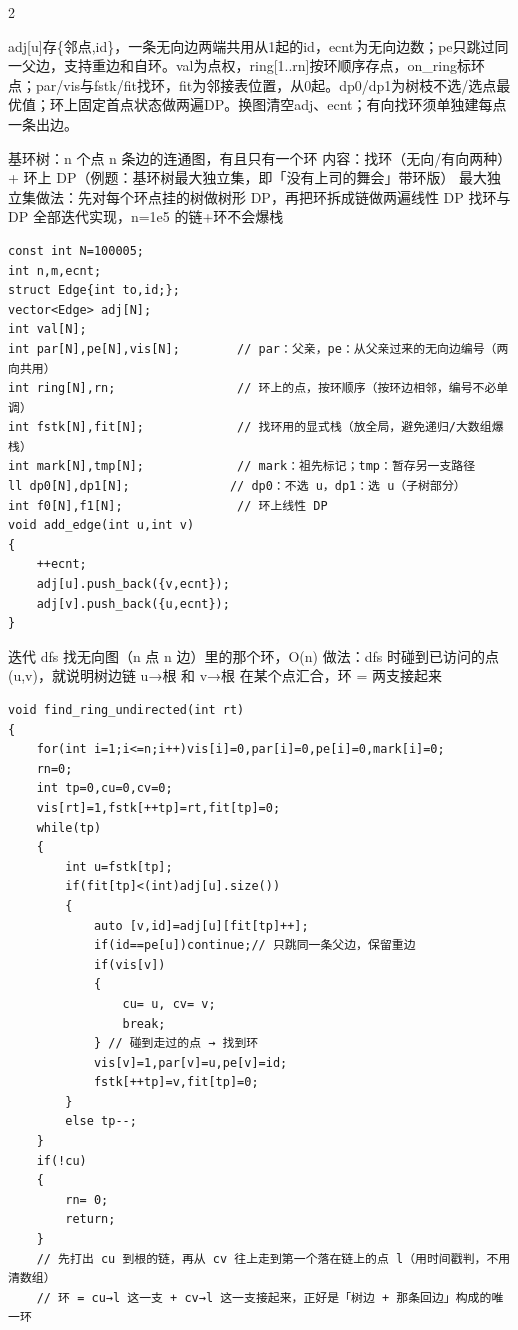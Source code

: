 \documentclass[UTF8,fontset=fandol,a4paper,twoside]{ctexart}
\newcommand{\note}[1]{{\fontsize{10}{12}\selectfont #1\par}}
\begin{document}
\begin{multicols}{2}
\note{adj[\allowbreak{}u]\allowbreak{}存\{邻点,\allowbreak{}id\}，一条无向边两端共用从1起的id，ecnt为无向边数；pe只跳过同一父边，支持重边和自环。val为点权，ring[\allowbreak{}1.\allowbreak{}.\allowbreak{}rn]\allowbreak{}按环顺序存点，on\_ring标环点；par/\allowbreak{}vis与fstk/\allowbreak{}fit找环，fit为邻接表位置，从0起。dp0/\allowbreak{}dp1为树枝不选/\allowbreak{}选点最优值；环上固定首点状态做两遍DP。换图清空adj、ecnt；有向找环须单独建每点一条出边。}
\note{基环树：n 个点 n 条边的连通图，有且只有一个环 内容：找环（无向/\allowbreak{}有向两种） +\allowbreak{} 环上 DP（例题：基环树最大独立集，即「没有上司的舞会」带环版） 最大独立集做法：先对每个环点挂的树做树形 DP，再把环拆成链做两遍线性 DP 找环与 DP 全部迭代实现，n=\allowbreak{}1e5 的链+\allowbreak{}环不会爆栈}
\begin{lstlisting}
const int N=100005;
int n,m,ecnt;
struct Edge{int to,id;};
vector<Edge> adj[N];
int val[N];
int par[N],pe[N],vis[N];        // par：父亲，pe：从父亲过来的无向边编号（两向共用）
int ring[N],rn;                 // 环上的点，按环顺序（按环边相邻，编号不必单调）
int fstk[N],fit[N];             // 找环用的显式栈（放全局，避免递归/大数组爆栈）
int mark[N],tmp[N];             // mark：祖先标记；tmp：暂存另一支路径
ll dp0[N],dp1[N];              // dp0：不选 u，dp1：选 u（子树部分）
int f0[N],f1[N];                // 环上线性 DP
void add_edge(int u,int v)
{
    ++ecnt;
    adj[u].push_back({v,ecnt});
    adj[v].push_back({u,ecnt});
}
\end{lstlisting}
\note{迭代 dfs 找无向图（n 点 n 边）里的那个环，O(\allowbreak{}n)\allowbreak{} 做法：dfs 时碰到已访问的点 (\allowbreak{}u,\allowbreak{}v)\allowbreak{}，就说明树边链 u→根 和 v→根 在某个点汇合，环 =\allowbreak{} 两支接起来}
\begin{lstlisting}
void find_ring_undirected(int rt)
{
    for(int i=1;i<=n;i++)vis[i]=0,par[i]=0,pe[i]=0,mark[i]=0;
    rn=0;
    int tp=0,cu=0,cv=0;
    vis[rt]=1,fstk[++tp]=rt,fit[tp]=0;
    while(tp)
    {
        int u=fstk[tp];
        if(fit[tp]<(int)adj[u].size())
        {
            auto [v,id]=adj[u][fit[tp]++];
            if(id==pe[u])continue;// 只跳同一条父边，保留重边
            if(vis[v])
            {
                cu= u, cv= v;
                break;
            } // 碰到走过的点 → 找到环
            vis[v]=1,par[v]=u,pe[v]=id;
            fstk[++tp]=v,fit[tp]=0;
        }
        else tp--;
    }
    if(!cu)
    {
        rn= 0;
        return;
    }
    // 先打出 cu 到根的链，再从 cv 往上走到第一个落在链上的点 l（用时间戳判，不用清数组）
    // 环 = cu→l 这一支 + cv→l 这一支接起来，正好是「树边 + 那条回边」构成的唯一环

\end{lstlisting}
\end{multicols}
\end{document}
